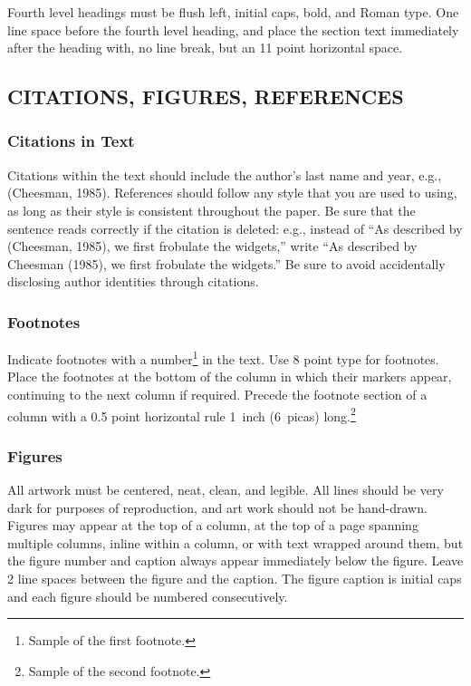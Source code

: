 \documentclass[twoside]{article}
\begin{document}
Fourth level headings must be flush left, initial caps, bold, and
Roman type.  One line space before the fourth level heading, and
place the section text immediately after the heading with, no line
break, but an 11 point horizontal space.

\subsection{CITATIONS, FIGURES, REFERENCES}


\subsubsection{Citations in Text}

Citations within the text should include the author's last name and
year, e.g., (Cheesman, 1985). References should follow any style that
you are used to using, as long as their style is consistent throughout
the paper.  Be sure that the sentence reads correctly if the citation
is deleted: e.g., instead of ``As described by (Cheesman, 1985), we
first frobulate the widgets,'' write ``As described by Cheesman
(1985), we first frobulate the widgets.''  Be sure to avoid
accidentally disclosing author identities through citations.

\subsubsection{Footnotes}

Indicate footnotes with a number\footnote{Sample of the first
  footnote.} in the text. Use 8 point type for footnotes. Place the
footnotes at the bottom of the column in which their markers appear,
continuing to the next column if required. Precede the footnote
section of a column with a 0.5 point horizontal rule 1~inch (6~picas)
long.\footnote{Sample of the second footnote.}

\subsubsection{Figures}

All artwork must be centered, neat, clean, and legible.  All lines
should be very dark for purposes of reproduction, and art work should
not be hand-drawn.  Figures may appear at the top of a column, at the
top of a page spanning multiple columns, inline within a column, or
with text wrapped around them, but the figure number and caption
always appear immediately below the figure.  Leave 2 line spaces
between the figure and the caption. The figure caption is initial caps
and each figure should be numbered consecutively.
\end{document}
